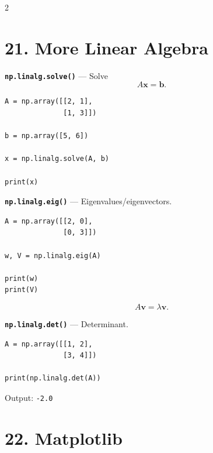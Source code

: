 \documentclass[10pt,a4paper]{article}
\begin{document}
\begin{multicols}{2}
\raggedcolumns

\section*{21. More Linear Algebra}

\begin{card}
\textbf{\texttt{np.linalg.solve()}} --- Solve
\[
A\mathbf x=\mathbf b.
\]

\begin{lstlisting}[style=pythonstyle]
A = np.array([[2, 1],
              [1, 3]])

b = np.array([5, 6])

x = np.linalg.solve(A, b)

print(x)
\end{lstlisting}
\end{card}

\begin{card}
\textbf{\texttt{np.linalg.eig()}} --- Eigenvalues/eigenvectors.

\begin{lstlisting}[style=pythonstyle]
A = np.array([[2, 0],
              [0, 3]])

w, V = np.linalg.eig(A)

print(w)
print(V)
\end{lstlisting}

\[
A\mathbf v=\lambda\mathbf v.
\]
\end{card}

\begin{card}
\textbf{\texttt{np.linalg.det()}} --- Determinant.

\begin{lstlisting}[style=pythonstyle]
A = np.array([[1, 2],
              [3, 4]])

print(np.linalg.det(A))
\end{lstlisting}

Output:
\texttt{-2.0}
\end{card}

\section*{22. Matplotlib}


\end{multicols}
\end{document}
